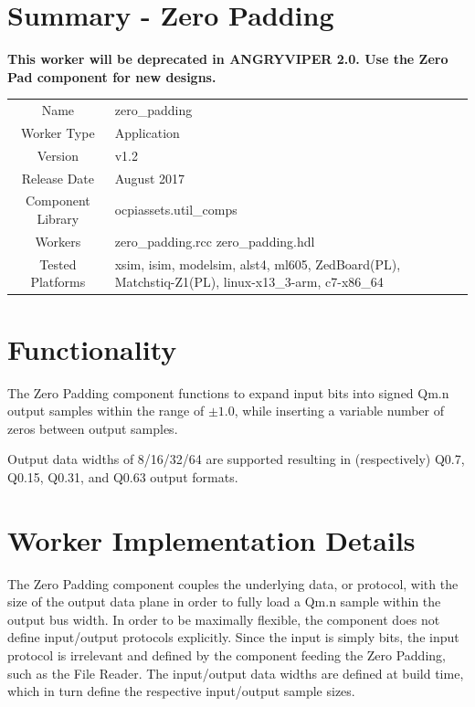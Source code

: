 \documentclass{article}
\author{} %
\date{Version \docVersion} %
\title{\docTitle}
\def\docVersion{1.2}
\def\comp{zero\_padding}
\def\Comp{Zero Padding}
\begin{document}
\section*{Summary - \Comp}
\textbf{This worker will be deprecated in ANGRYVIPER 2.0. Use the Zero Pad component for new designs.}\\

\begin{tabular}{|c|M{13.5cm}|}
	\hline
	                  &                                                                                            \\
	\hline
	Name              & \comp                                                                                      \\
	\hline
	Worker Type       & Application                                                                                \\
	\hline
	Version           & v\docVersion \\
	\hline
	Release Date      & August 2017 \\
	\hline
	Component Library & ocpiassets.util\_comps                                                                     \\
	\hline
	Workers           & \comp.rcc \comp.hdl                                                                        \\
	\hline
	Tested Platforms  & xsim, isim, modelsim, alst4, ml605, ZedBoard(PL), Matchstiq-Z1(PL), linux-x13\_3-arm, c7-x86\_64 \\
	\hline
\end{tabular}

\section*{Functionality}
\begin{flushleft}
	The {\Comp} component functions to expand input bits into signed Qm.n output samples within the range of $\pm1.0$, while inserting a variable number of zeros between output samples.\medskip

	Output data widths of 8/16/32/64 are supported resulting in (respectively) Q0.7, Q0.15, Q0.31, and Q0.63 output formats.
\end{flushleft}

\section*{Worker Implementation Details}
\begin{flushleft}
	The {\Comp} component couples the underlying data, or protocol, with the size of the output data plane in order to fully load a Qm.n sample within the output bus width. In order to be maximally flexible, the component does not define input/output protocols explicitly. Since the input is simply bits, the input protocol is irrelevant and defined by the component feeding the Zero Padding, such as the File Reader. The input/output data widths are defined at build time, which in turn define the respective input/output sample sizes.
\end{flushleft}
\end{document}
